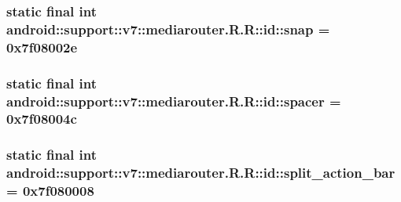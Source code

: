 \hypertarget{classandroid_1_1support_1_1v7_1_1mediarouter_1_1_r_1_1id_0ddc60dd72cc3019522f6a15a5d34b5a}{
\subsubsection[{snap}]{\setlength{\rightskip}{0pt plus 5cm}static final int android::support::v7::mediarouter.R.R::id::snap = 0x7f08002e}}
\label{classandroid_1_1support_1_1v7_1_1mediarouter_1_1_r_1_1id_0ddc60dd72cc3019522f6a15a5d34b5a}


\hypertarget{classandroid_1_1support_1_1v7_1_1mediarouter_1_1_r_1_1id_7066ca732394ea6571dcf34f740179d4}{
\subsubsection[{spacer}]{\setlength{\rightskip}{0pt plus 5cm}static final int android::support::v7::mediarouter.R.R::id::spacer = 0x7f08004c}}
\label{classandroid_1_1support_1_1v7_1_1mediarouter_1_1_r_1_1id_7066ca732394ea6571dcf34f740179d4}


\hypertarget{classandroid_1_1support_1_1v7_1_1mediarouter_1_1_r_1_1id_f704ef067bc394aaac9340e8185ff8a2}{
\subsubsection[{split\_\-action\_\-bar}]{\setlength{\rightskip}{0pt plus 5cm}static final int android::support::v7::mediarouter.R.R::id::split\_\-action\_\-bar = 0x7f080008}}
\label{classandroid_1_1support_1_1v7_1_1mediarouter_1_1_r_1_1id_f704ef067bc394aaac9340e8185ff8a2}


